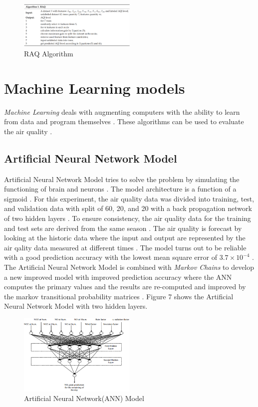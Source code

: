 \documentclass[sigconf]{acmart}
\begin{document}
\begin{figure}
\includegraphics[width=0.5\textwidth]{images/fig6.png}
\caption{RAQ Algorithm \cite{raq2016}}
\end{figure}

\section{Machine Learning models}
{\em Machine Learning} deals with augmenting computers with the ability to learn from data and program themselves \cite{gagan2017}. These algorithms can be used to evaluate the air quality \cite{gagan2017}. 

\subsection{Artificial Neural Network Model}
Artificial Neural Network Model tries to solve the problem by simulating the functioning of brain and neurons \cite{gagan2017}. The model architecture is a function of a sigmoid \cite{gagan2017}. For this experiment, the air quality data was divided into training, test, and validation data with  split of 60, 20, and 20 with a back propagation network of two hidden layers \cite{gagan2017}. To ensure consistency, the air quality data for the training and test sets are derived from the same season \cite{gagan2017}. The air quality is forecast by looking at the historic data where the input and output are represented by the air qality data measured at different times \cite{gagan2017}. The model turns out to be reliable with a good prediction accuracy with the lowest mean square error of $3.7 \times 10^{-4}$ \cite{gagan2017}. The Artificial Neural Network Model is combined with {\em Markov Chains} to develop a new improved model with improved prediction accuracy where the ANN computes the primary values and the results are re-computed and improved by the markov transitional probability matrices \cite{gagan2017}. Figure 7 shows the Artificial Neural Network Model with two hidden layers. 

\begin{figure}
\includegraphics[width=0.5\textwidth]{images/fig7.png}
\caption{Artificial Neural Network(ANN) Model \cite{gagan2017}}
\end{figure}
\end{document}
